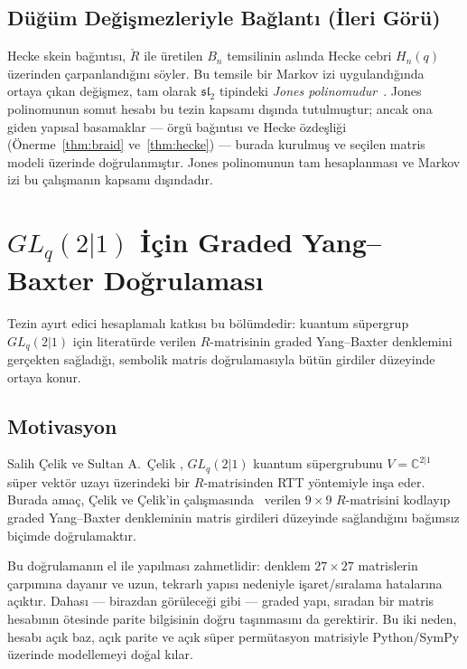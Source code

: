 \documentclass[12pt,a4paper,fleqn]{report}
\newcommand{\normalsemi}{;}
\newcommand{\normalsemi}{\begingroup\semicolonfont;\endgroup}
\numberwithin{equation}{chapter}
\theoremstyle{plain}
\theoremstyle{definition}
\renewcommand{\sl}{\mathfrak{sl}}
\begin{document}
\section{Düğüm Değişmezleriyle Bağlantı (İleri Görü)}

Hecke skein bağıntısı, $\check R$ ile üretilen $B_n$ temsilinin aslında Hecke
cebri $H_n(q)$ üzerinden çarpanlandığını söyler. Bu temsile bir Markov izi
uygulandığında ortaya çıkan değişmez, tam olarak $\sl_2$ tipindeki
\emph{Jones polinomudur}~\cite{Jones}. Jones polinomunun somut hesabı bu tezin kapsamı
dışında tutulmuştur\normalsemi{} ancak ona giden yapısal basamaklar --- örgü bağıntısı ve
Hecke özdeşliği (Önerme~\ref{thm:braid} ve~\ref{thm:hecke}) --- burada kurulmuş
ve seçilen matris modeli üzerinde doğrulanmıştır. Jones polinomunun tam
hesaplanması ve Markov izi bu çalışmanın kapsamı dışındadır.

\chapter{$GL_q(2|1)$ İçin Graded Yang--Baxter Doğrulaması}

Tezin ayırt edici hesaplamalı katkısı bu bölümdedir: kuantum süpergrup
$GL_q(2|1)$ için literatürde verilen $R$-matrisinin graded Yang--Baxter
denklemini gerçekten sağladığı, sembolik matris doğrulamasıyla bütün girdiler
düzeyinde ortaya konur.

\section{Motivasyon}

Salih Çelik ve Sultan A.\ Çelik \cite{CelikGL21}, $GL_q(2|1)$ kuantum süpergrubunu
$V=\mathbb{C}^{2|1}$ süper vektör uzayı üzerindeki bir $R$-matrisinden RTT
yöntemiyle inşa eder. Burada amaç, Çelik ve Çelik'in çalışmasında~\cite{CelikGL21} verilen $9\times 9$ $R$-matrisini
kodlayıp graded Yang--Baxter denkleminin matris girdileri düzeyinde sağlandığını
bağımsız biçimde doğrulamaktır.

Bu doğrulamanın el ile yapılması zahmetlidir: denklem $27\times 27$ matrislerin
çarpımına dayanır ve uzun, tekrarlı yapısı nedeniyle işaret/sıralama hatalarına
açıktır. Dahası --- birazdan görüleceği gibi --- graded yapı, sıradan bir
matris hesabının ötesinde parite bilgisinin doğru taşınmasını da gerektirir. Bu
iki neden, hesabı açık baz, açık parite ve açık süper permütasyon matrisiyle
Python/SymPy üzerinde modellemeyi doğal kılar.
\end{document}
